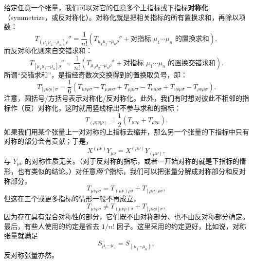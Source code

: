 给定任意一个张量，我们可以对它的任意多个上指标或下指标\textbf{对称化}（symmetrize，或反对称化）。对称化就是把相关指标的所有置换求和，再除以项数：
\begin{equation*}
T_{(\mu_1\mu_2\cdots\mu_n)\rho}{}^{\sigma} = \frac{1}{n!}\left(T_{\mu_1\mu_2\cdots\mu_n\rho}{}^{\sigma} + \text{对指标 }\mu_1\cdots\mu_n\text{ 的置换求和}\right),
\tag{1.79}
\end{equation*}
而反对称化则来自交错求和：
\begin{equation*}
T_{[\mu_1\mu_2\cdots\mu_n]\rho}{}^{\sigma} = \frac{1}{n!}\left(T_{\mu_1\mu_2\cdots\mu_n\rho}{}^{\sigma} + \text{对指标 }\mu_1\cdots\mu_n\text{ 的置换交错求和}\right).
\tag{1.80}
\end{equation*}
所谓“交错求和”，是指经奇数次交换得到的置换取负号，即：
\begin{equation*}
T_{[\mu\nu\rho]\sigma} = \frac{1}{6}\left(T_{\mu\nu\rho\sigma} - T_{\mu\rho\nu\sigma} + T_{\rho\mu\nu\sigma} - T_{\nu\mu\rho\sigma} + T_{\nu\rho\mu\sigma} - T_{\rho\nu\mu\sigma}\right).
\tag{1.81}
\end{equation*}
注意，圆括号/方括号表示对称化/反对称化。此外，我们有时想对彼此不相邻的指标作（反）对称化，这时就用竖线标出不参与求和的指标：
\begin{equation*}
T_{(\mu|\nu|\rho)} = \frac{1}{2}\left(T_{\mu\nu\rho} + T_{\rho\nu\mu}\right).
\tag{1.82}
\end{equation*}
如果我们用某个张量上一对对称的上指标去缩并，那么另一个张量的下指标中只有对称的部分会有贡献；于是，
\begin{equation*}
X^{(\mu\nu)}Y_{\mu\nu} = X^{(\mu\nu)}Y_{(\mu\nu)},
\tag{1.83}
\end{equation*}
与 $Y_{\mu\nu}$ 的对称性质无关。（对于反对称的指标，或者一开始对称的就是下指标的情形，也有类似的结论。）对任意\emph{两个}指标，我们可以把张量分解成对称部分和反对称部分，
\begin{equation*}
T_{\mu\nu\rho\sigma} = T_{(\mu\nu)\rho\sigma} + T_{[\mu\nu]\rho\sigma},
\tag{1.84}
\end{equation*}
但这在三个或更多指标的情形一般不再成立，
\begin{equation*}
T_{\mu\nu\rho\sigma} \neq T_{(\mu\nu\rho)\sigma} + T_{[\mu\nu\rho]\sigma},
\tag{1.85}
\end{equation*}
因为存在具有混合对称性的部分，它们既不由对称部分、也不由反对称部分确定。最后，有些人使用的约定是省去 $1/n!$ 因子。这里采用的约定更好，比如说，对称张量就满足
\begin{equation*}
S_{\mu_1\cdots\mu_n} = S_{(\mu_1\cdots\mu_n)},
\tag{1.86}
\end{equation*}
反对称张量亦然。

